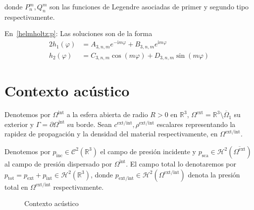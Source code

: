 \documentclass[11pt]{article}
\numberwithin{equation}{section}
\def\R{\mathbb{R}}
\def\H{\mathcal{H}}
\def\Cc{\mathcal{C}}
\let\i\relax
\def\i{\mathrm{i}}
\def\tot{\textrm{tot}}
\def\exterior{\textrm{ext}}
\def\interior{\textrm{int}}
\def\inc{\textrm{inc}}
\def\sca{\textrm{sca}}
\begin{document}
donde \(P^m_n, Q^m_n\) son las funciones de Legendre asociadas de primer y
segundo tipo respectivamente.

En~\eqref{helmholtz:p}: Las soluciones son de la forma
\begin{alignat}{2}
\label{h1}
	h_1(\varphi) &= A_{3,n,m} e^{-\i m\varphi} + B_{3,n,m} e^{\i m\varphi}\\
\label{h2}
	h_2(\varphi) &= C_{3,n,m} \cos(m\varphi) + D_{3,n,m} \sin(m\varphi)
\end{alignat}

\section{Contexto acústico}%
\label{sec:acustico}

Denotemos por \(\Omega^{\interior}\) a la esfera abierta de radio \(R>0\) en \(\R^3\), \(\Omega^{\exterior} =
\R^3\setminus \overline{\Omega}_{1}\) su exterior y \(\Gamma = \partial\Omega^{\interior}\)
su borde. Sean \(c^{\exterior/\interior}, \rho^{\exterior/\interior}\) escalares representando la
rapidez de propagación y la densidad del material respectivamente, en
\(\Omega^{\exterior/\interior}\).

Denotemos por \(p_{\inc}\in \Cc^{2}(\R^3)\) el campo de presión 
incidente y \(p_{\sca}\in \H^{2}(\overline{\Omega^{\exterior}})\) al campo
de presión dispersado por \(\Omega^{\interior}\). El campo total lo denotaremos por
\(p_{\tot} = p_{\exterior} + p_{\interior} \in \H^2(\R^3)\), donde
\(p_{\exterior/\interior} \in \H^{2}(\Omega^{\exterior/\interior})\)
denota la presión total en \(\Omega^{\exterior/\interior}\) respectivamente.

\begin{figure}[H]
\centering
{}
\caption{Contexto acústico}
\end{figure}
\end{document}
